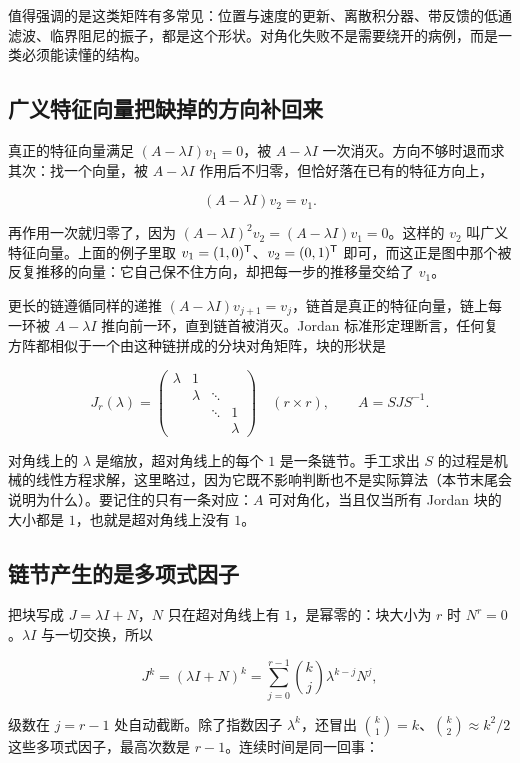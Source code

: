 值得强调的是这类矩阵有多常见：位置与速度的更新、离散积分器、带反馈的低通滤波、临界阻尼的振子，都是这个形状。对角化失败不是需要绕开的病例，而是一类必须能读懂的结构。

\subsection{广义特征向量把缺掉的方向补回来}

真正的特征向量满足 \((A-\lambda I)v_1=0\)，被 \(A-\lambda I\) 一次消灭。方向不够时退而求其次：找一个向量，被 \(A-\lambda I\) 作用后不归零，但恰好落在已有的特征方向上，

\[
(A-\lambda I)v_2=v_1 .
\]

再作用一次就归零了，因为 \((A-\lambda I)^2v_2=(A-\lambda I)v_1=0\)。这样的 \(v_2\) 叫广义特征向量。上面的例子里取 \(v_1=(1,0)^{\mathsf{T}}\)、\(v_2=(0,1)^{\mathsf{T}}\) 即可，而这正是图中那个被反复推移的向量：它自己保不住方向，却把每一步的推移量交给了 \(v_1\)。

更长的链遵循同样的递推 \((A-\lambda I)v_{j+1}=v_j\)，链首是真正的特征向量，链上每一环被 \(A-\lambda I\) 推向前一环，直到链首被消灭。Jordan 标准形定理断言，任何复方阵都相似于一个由这种链拼成的分块对角矩阵，块的形状是

\[
J_r(\lambda)=
\begin{pmatrix}
\lambda&1&&\\
&\lambda&\ddots&\\
&&\ddots&1\\
&&&\lambda
\end{pmatrix}
\quad(r\times r),
\qquad
A=SJS^{-1}.
\]

对角线上的 \(\lambda\) 是缩放，超对角线上的每个 \(1\) 是一条链节。手工求出 \(S\) 的过程是机械的线性方程求解，这里略过，因为它既不影响判断也不是实际算法（本节末尾会说明为什么）。要记住的只有一条对应：\(A\) 可对角化，当且仅当所有 Jordan 块的大小都是 \(1\)，也就是超对角线上没有 \(1\)。

\subsection{链节产生的是多项式因子}

把块写成 \(J=\lambda I+N\)，\(N\) 只在超对角线上有 \(1\)，是幂零的：块大小为 \(r\) 时 \(N^r=0\)。\(\lambda I\) 与一切交换，所以

\[
J^k=(\lambda I+N)^k=\sum_{j=0}^{r-1}\binom{k}{j}\lambda^{k-j}N^j,
\]

级数在 \(j=r-1\) 处自动截断。除了指数因子 \(\lambda^k\)，还冒出 \(\binom{k}{1}=k\)、\(\binom{k}{2}\approx k^2/2\) 这些多项式因子，最高次数是 \(r-1\)。连续时间是同一回事：

